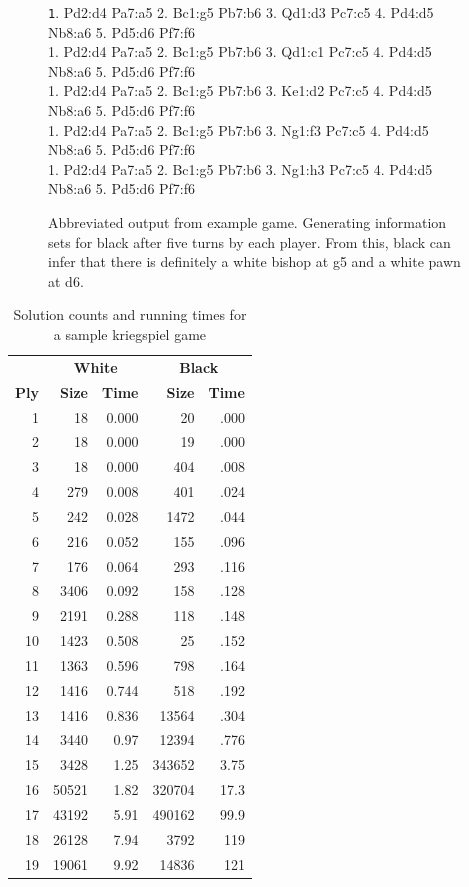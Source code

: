 \documentclass[conference]{IEEEtran}
\newenvironment{mytinylisting}
{\begin{list}{}{\setlength{\leftmargin}{1em}}\item\scriptsize\texttt}
{\end{list}}
\begin{document}
\begin{figure}
\begin{mytinylisting}
1. Pd2:d4 Pa7:a5 2. Bc1:g5 Pb7:b6 3. Qd1:d3 Pc7:c5 4. Pd4:d5 Nb8:a6 5. Pd5:d6 Pf7:f6 \\
1. Pd2:d4 Pa7:a5 2. Bc1:g5 Pb7:b6 3. Qd1:c1 Pc7:c5 4. Pd4:d5 Nb8:a6 5. Pd5:d6 Pf7:f6 \\
1. Pd2:d4 Pa7:a5 2. Bc1:g5 Pb7:b6 3. Ke1:d2 Pc7:c5 4. Pd4:d5 Nb8:a6 5. Pd5:d6 Pf7:f6 \\
1. Pd2:d4 Pa7:a5 2. Bc1:g5 Pb7:b6 3. Ng1:f3 Pc7:c5 4. Pd4:d5 Nb8:a6 5. Pd5:d6 Pf7:f6 \\
1. Pd2:d4 Pa7:a5 2. Bc1:g5 Pb7:b6 3. Ng1:h3 Pc7:c5 4. Pd4:d5 Nb8:a6 5. Pd5:d6 Pf7:f6 \\
\end{mytinylisting}
\caption{Abbreviated output from example game.  Generating information sets for black after five turns by each player.
From this, black can infer that there is definitely a white bishop at g5 and a white pawn at d6.}
\label{abbrevoutput}
\end{figure}

\begin{table}
\centering
\begin{tabular}{rrrrr}
 & \multicolumn{2}{c}{\bf White} & \multicolumn{2}{c}{\bf Black} \\
{\bf Ply} & {\bf Size} & {\bf Time} & {\bf Size} & {\bf Time} \\
1 & 18 & 0.000 & 20 & .000 \\
2 & 18 & 0.000 & 19 & .000 \\
3 & 18 & 0.000 & 404 & .008\\
4 & 279 & 0.008 & 401 & .024\\
5 & 242 & 0.028 & 1472 & .044\\
6 & 216 & 0.052 & 155 & .096\\
7 & 176 & 0.064 & 293 & .116\\
8 & 3406 & 0.092 & 158 & .128\\
9 & 2191 & 0.288 & 118 & .148\\
10 & 1423 & 0.508 & 25 & .152\\
11 & 1363 & 0.596 & 798 & .164\\
12 & 1416 & 0.744 & 518 & .192\\
13 & 1416 & 0.836 & 13564 & .304\\
14 & 3440 & 0.97 & 12394 & .776\\
15 & 3428 & 1.25 & 343652 & 3.75\\
16 & 50521 & 1.82 & 320704 & 17.3\\
17 & 43192 & 5.91 & 490162 & 99.9\\
18 & 26128 & 7.94 & 3792 & 119\\
19 & 19061 & 9.92 & 14836 & 121\\
\end{tabular}
\caption{Solution counts and running times for a sample kriegspiel game}
\label{bothtimes}
\end{table}
\end{document}
